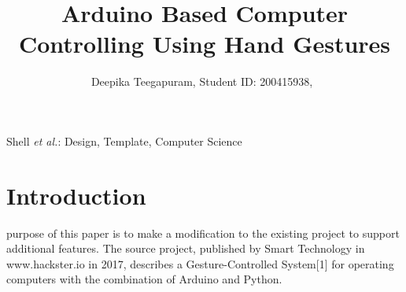 \documentclass[journal]{IEEEtran}
\begin{document}

\title{Arduino Based Computer Controlling Using Hand Gestures}


\author{Deepika Teegapuram, Student ID: 200415938,~
        }
\onecolumn

%
{Shell \MakeLowercase{\textit{et al.}}: Design, Template, Computer Science }


\maketitle




%


\section{Introduction}

% 
 purpose of this paper is to make a modification to the existing project to support additional features. The source project, published by Smart Technology in www.hackster.io in 2017, describes a Gesture-Controlled System[1] for operating computers with the combination of Arduino and Python. 
\end{document}
